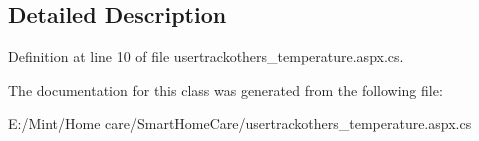 \subsection{Detailed Description}


Definition at line 10 of file usertrackothers\-\_\-temperature.\-aspx.\-cs.



The documentation for this class was generated from the following file\-:\begin{DoxyCompactItemize}
\item 
E\-:/\-Mint/\-Home care/\-Smart\-Home\-Care/usertrackothers\-\_\-temperature.\-aspx.\-cs\end{DoxyCompactItemize}
